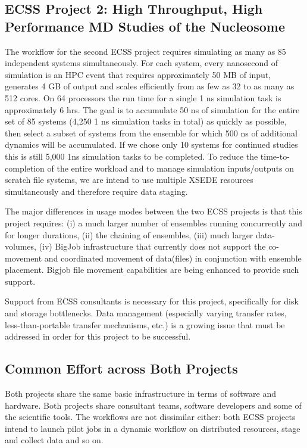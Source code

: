 \documentclass{sig-alternate}
\begin{document}
\subsection{ECSS Project 2: High Throughput, High Performance MD
  Studies of the Nucleosome}

The workflow for the second ECSS project requires simulating as many as 85
independent systems simultaneously. For each system, every nanosecond of
simulation is an HPC event that requires approximately 50 MB of input, generates
4 GB of output and scales efficiently from as few as 32 to as many as 512 cores.
On 64 processors the run time for a single 1 ns simulation task is approximately
6 hrs. The goal is to accumulate 50 ns of simulation for the entire set of 85
systems (4,250 1 ns simulation tasks in total) as quickly as possible, then
select a subset of systems from the ensemble for which 500 ns of additional
dynamics will be accumulated. If we chose only 10 systems for continued studies
this is still 5,000 1ns simulation tasks to be completed. To reduce the
time-to-completion of the entire workload and to manage simulation
inputs/outputs on scratch file systems, we are intend to use multiple XSEDE
resources simultaneously and therefore require data staging.

The major differences in usage modes between the two ECSS projects is
that this project requires: (i) a much larger number of ensembles
running concurrently and for longer durations, (ii) the chaining of
ensembles, (iii) much larger data-volumes, (iv) BigJob  infrastructure that currently does not support the
co-movement and coordinated movement of data(files) in conjunction
with ensemble placement. Bigjob file movement capabilities are being
enhanced to provide such support.

Support from ECSS consultants is necessary for this project, specifically for disk
and storage bottlenecks. Data management (especially varying transfer rates,
less-than-portable transfer mechanisms, etc.) is a growing issue that must be 
addressed in order for this project to be successful.

\subsection{Common Effort across Both Projects}

Both projects share the same basic infrastructure in terms of software and
hardware. Both projects share consultant teams, software developers and some of
the scientific tools. The workflows are not dissimilar either: both ECSS
projects intend to launch pilot jobs in a dynamic workflow on distributed
resources, stage and collect data and so on.
\end{document}
